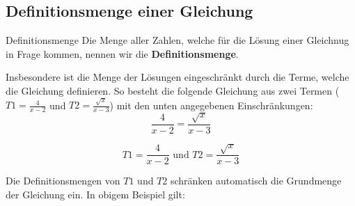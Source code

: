 
  
\subsection{Definitionsmenge einer
    Gleichung}

\begin{definition}{Definitionsmenge}{}  Die Menge aller Zahlen, welche für die Lösung einer Gleichnug in Frage kommen,
  nennen wir die \textbf{Definitionsmenge}.
\end{definition}

  Insbesondere ist die Menge der Lösungen eingeschränkt durch
  die Terme, welche die Gleichung definieren. So besteht die folgende
  Gleichung aus zwei Termen ($T1=\frac{4}{x-2}$ und $T2=\frac{\sqrt{x}}{x-3}$) mit den unten angegebenen
  Einschränkungen:
  $$\frac{4}{x-2}=\frac{\sqrt{x}}{x-3}$$

$$T1=\frac{4}{x-2} \text{ und } T2=\frac{\sqrt{x}}{x-3}$$
  
  Die Definitionsmengen von $T1$ und $T2$ schränken automatisch die
  Grundmenge der Gleichung ein. In obigem Beispiel gilt:
  
